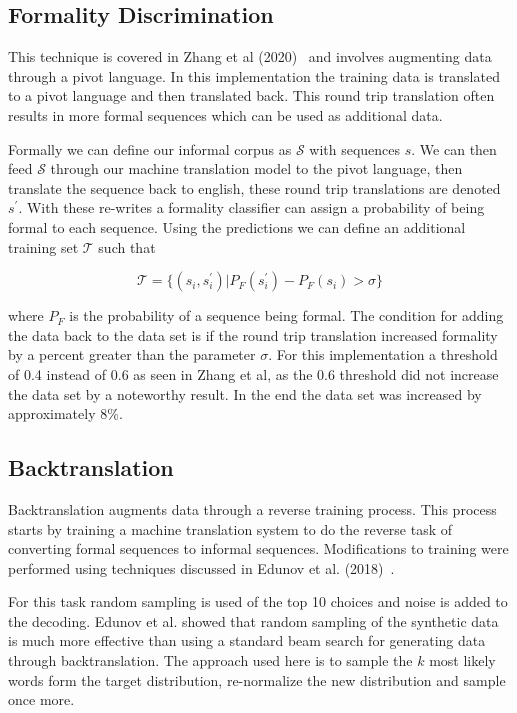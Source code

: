 \documentclass[12pt]{article}
\begin{document}
\subsection{Formality Discrimination}
This technique is covered in Zhang et al (2020)~\cite{paralleldataaug} and involves
augmenting data through a pivot language. In this implementation the training data is translated 
to a pivot language and then translated back. This round trip translation often results in more 
formal sequences which can be used as additional data. \par
Formally we can define our informal corpus as $\mathcal{S}$  with sequences $s$. We can then 
feed $\mathcal{S}$ through our machine translation model to the pivot language, then translate 
the sequence back to english, these round trip translations are denoted $s^\prime$. 
With these re-writes a formality classifier can assign a probability 
of being formal to each sequence. Using the predictions we can define an additional training set 
$\mathcal{T}$ such that 


$$\mathcal{T} = \{(s_i, s_i^\prime)|P_F(s_i^\prime) - P_F(s_i) > \sigma \}$$ 

where $P_F$ is the probability of a sequence being formal. The condition for adding the data
back to the data set is if the round trip translation increased formality by a percent greater
than the parameter $\sigma$. For this implementation a threshold of 0.4 instead of 0.6 as seen
in Zhang et al, as the 0.6 threshold did not increase the data set by a noteworthy result. 
In the end the data set was increased by approximately 8\%. 

\subsection{Backtranslation}
Backtranslation augments data through a reverse training process. This process starts by 
training a machine translation system to do the reverse task of converting formal sequences 
to informal sequences. Modifications to training were performed using techniques discussed in 
Edunov et al. (2018)~\cite{backtranslation}. \par 

For this task random sampling is used of the 
top 10 choices and noise is added to the decoding. Edunov et al. showed that random sampling 
of the synthetic data is much more effective than using a standard beam search for generating data through
backtranslation. The approach used here is to sample the $k$ most likely 
words form the target distribution, re-normalize the new distribution and sample once more. \par
\end{document}
